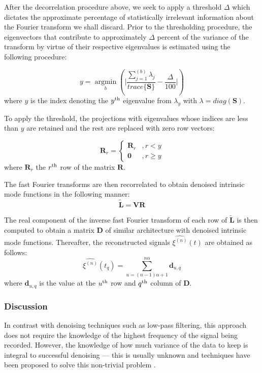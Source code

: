 \documentclass[onecolumn, groupedaddress, 10pt]{revtex4-1}
\begin{document}
After the decorrelation procedure above, we seek to apply a threshold $\Delta$ which dictates the approximate percentage of statistically irrelevant information about the Fourier transform we shall discard. Prior to the thresholding procedure, the eigenvectors that contribute to approximately $\Delta$ percent of the variance of the transform by virtue of their respective eigenvalues is estimated using the following procedure:

\begin{equation}
y = \underset{b}{\operatorname{argmin}} \left( \Bigg| \frac{\sum_{j=1}^{(b)} \lambda_j}{trace \{ \mathbf{S} \}} - \frac{\Delta}{100} \Bigg| \right)
\end{equation}
where $y$ is the index denoting the $y^\textnormal{th}$ eigenvalue from $\lambda_y$ with $\lambda = diag{(\mathbf{S})}$.

To apply the threshold, the projections with eigenvalues whose indices are less than $y$ are retained and the rest are replaced with zero row vectors:

\begin{displaymath}
   \mathbf{R}_r = \left\{
     \begin{array}{lr}
        \mathbf{R}_r & , r < y     \\
       \mathbf{0} & , r \geq y
     \end{array}
   \right.
\end{displaymath}
where $\mathbf{R}_r$ the $r^{\textnormal{th}}$ row of the matrix $\mathbf{R}$.

The fast Fourier transforms are then recorrelated to obtain denoised intrinsic mode functions in the following manner:
\begin{equation}
\tilde{ \mathbf{L} } = \mathbf{V}\mathbf{R}
\end{equation}

The real component of the inverse fast Fourier transform of each row of $\mathbf{\tilde{L}}$ is then computed to obtain a matrix $\mathbf{D}$ of similar architecture with denoised intrinsic mode functions. Thereafter, the reconstructed signals $\hat{\xi^{(n)}}(t)$ are obtained as follows:
\begin{equation}
\hat{\xi^{(n)}}(t_{q}) = \sum_{u = (n-1)\alpha + 1}^{n\alpha} \mathbf{d}_{u,q}
\end{equation}
where $\mathbf{d}_{u,q}$ is the value at the $u^\textnormal{th}$ row and $q^\textnormal{th}$ column of $\textbf{D}$.

\subsubsection{Discussion}
In contrast with denoising techniques such as low-pass filtering, this approach does not require the knowledge of the highest frequency of the signal being recorded. However, the knowledge of how much variance of the data to keep is integral to successful denoising --- this is usually unknown and techniques have been proposed to solve this non-trivial problem \cite{}.
\end{document}
